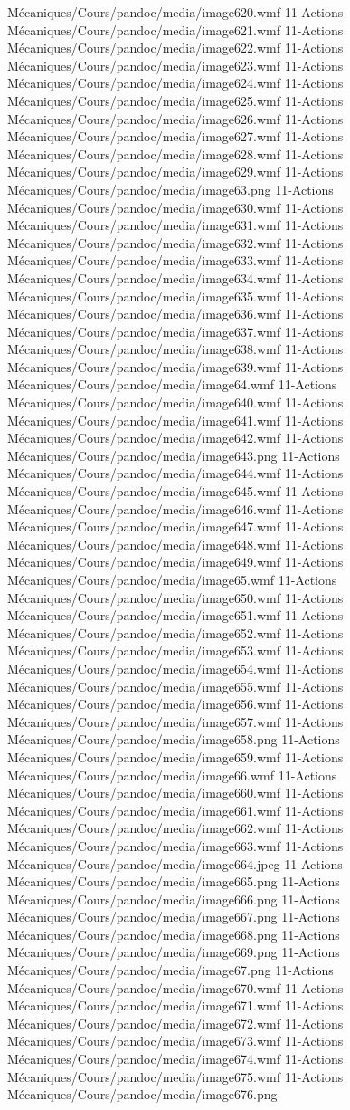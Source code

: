 Mécaniques/Cours/pandoc/media/image620.wmf 11-Actions Mécaniques/Cours/pandoc/media/image621.wmf 11-Actions Mécaniques/Cours/pandoc/media/image622.wmf 11-Actions Mécaniques/Cours/pandoc/media/image623.wmf 11-Actions Mécaniques/Cours/pandoc/media/image624.wmf 11-Actions Mécaniques/Cours/pandoc/media/image625.wmf 11-Actions Mécaniques/Cours/pandoc/media/image626.wmf 11-Actions Mécaniques/Cours/pandoc/media/image627.wmf 11-Actions Mécaniques/Cours/pandoc/media/image628.wmf 11-Actions Mécaniques/Cours/pandoc/media/image629.wmf 11-Actions Mécaniques/Cours/pandoc/media/image63.png 11-Actions Mécaniques/Cours/pandoc/media/image630.wmf 11-Actions Mécaniques/Cours/pandoc/media/image631.wmf 11-Actions Mécaniques/Cours/pandoc/media/image632.wmf 11-Actions Mécaniques/Cours/pandoc/media/image633.wmf 11-Actions Mécaniques/Cours/pandoc/media/image634.wmf 11-Actions Mécaniques/Cours/pandoc/media/image635.wmf 11-Actions Mécaniques/Cours/pandoc/media/image636.wmf 11-Actions Mécaniques/Cours/pandoc/media/image637.wmf 11-Actions Mécaniques/Cours/pandoc/media/image638.wmf 11-Actions Mécaniques/Cours/pandoc/media/image639.wmf 11-Actions Mécaniques/Cours/pandoc/media/image64.wmf 11-Actions Mécaniques/Cours/pandoc/media/image640.wmf 11-Actions Mécaniques/Cours/pandoc/media/image641.wmf 11-Actions Mécaniques/Cours/pandoc/media/image642.wmf 11-Actions Mécaniques/Cours/pandoc/media/image643.png 11-Actions Mécaniques/Cours/pandoc/media/image644.wmf 11-Actions Mécaniques/Cours/pandoc/media/image645.wmf 11-Actions Mécaniques/Cours/pandoc/media/image646.wmf 11-Actions Mécaniques/Cours/pandoc/media/image647.wmf 11-Actions Mécaniques/Cours/pandoc/media/image648.wmf 11-Actions Mécaniques/Cours/pandoc/media/image649.wmf 11-Actions Mécaniques/Cours/pandoc/media/image65.wmf 11-Actions Mécaniques/Cours/pandoc/media/image650.wmf 11-Actions Mécaniques/Cours/pandoc/media/image651.wmf 11-Actions Mécaniques/Cours/pandoc/media/image652.wmf 11-Actions Mécaniques/Cours/pandoc/media/image653.wmf 11-Actions Mécaniques/Cours/pandoc/media/image654.wmf 11-Actions Mécaniques/Cours/pandoc/media/image655.wmf 11-Actions Mécaniques/Cours/pandoc/media/image656.wmf 11-Actions Mécaniques/Cours/pandoc/media/image657.wmf 11-Actions Mécaniques/Cours/pandoc/media/image658.png 11-Actions Mécaniques/Cours/pandoc/media/image659.wmf 11-Actions Mécaniques/Cours/pandoc/media/image66.wmf 11-Actions Mécaniques/Cours/pandoc/media/image660.wmf 11-Actions Mécaniques/Cours/pandoc/media/image661.wmf 11-Actions Mécaniques/Cours/pandoc/media/image662.wmf 11-Actions Mécaniques/Cours/pandoc/media/image663.wmf 11-Actions Mécaniques/Cours/pandoc/media/image664.jpeg 11-Actions Mécaniques/Cours/pandoc/media/image665.png 11-Actions Mécaniques/Cours/pandoc/media/image666.png 11-Actions Mécaniques/Cours/pandoc/media/image667.png 11-Actions Mécaniques/Cours/pandoc/media/image668.png 11-Actions Mécaniques/Cours/pandoc/media/image669.png 11-Actions Mécaniques/Cours/pandoc/media/image67.png 11-Actions Mécaniques/Cours/pandoc/media/image670.wmf 11-Actions Mécaniques/Cours/pandoc/media/image671.wmf 11-Actions Mécaniques/Cours/pandoc/media/image672.wmf 11-Actions Mécaniques/Cours/pandoc/media/image673.wmf 11-Actions Mécaniques/Cours/pandoc/media/image674.wmf 11-Actions Mécaniques/Cours/pandoc/media/image675.wmf 11-Actions Mécaniques/Cours/pandoc/media/image676.png 